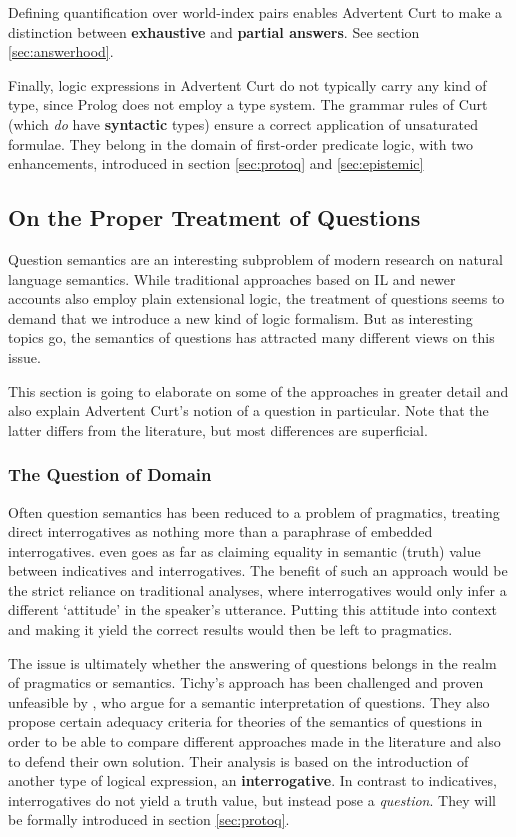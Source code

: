 \documentclass[11pt,a4paper]{article}
\newcommand{\abbr}{\textsf} %
\newcommand{\stress}{\textbf} %
\newcommand{\term}[1]{\textsf{\textbf{#1}}} %
\newcommand{\pn}{\textsf} %
\newcommand{\curt}{\pn{Curt}}
\newcommand{\acurt}{\pn{Advertent Curt}}
\newcommand{\prol}{\pn{Prolog}}
\theoremstyle{remark}
\theoremstyle{remark}
\theoremstyle{definition}
\begin{document}
Defining quantification over world-index pairs enables \acurt{} to make a
distinction between \term{exhaustive} and \term{partial answers}. See section
\ref{sec:answerhood}.

Finally, logic expressions in \acurt{} do not typically carry any kind of type,
since \prol{} does not employ a type system. The grammar rules of \curt{} (which
\emph{do} have \stress{syntactic} types) ensure a correct application of
unsaturated formulae. They belong in the domain of first-order predicate logic,
with two enhancements, introduced in section \ref{sec:protoq} and \ref{sec:epistemic}

\subsection{On the Proper Treatment of Questions}

Question semantics are an interesting subproblem of modern research on natural
language semantics. While traditional approaches based on \abbr{IL} and newer
accounts also employ plain extensional logic, %
the treatment
of questions seems to demand that we introduce a new kind of logic formalism.
But as interesting topics go, the semantics of questions has attracted many
different views on this issue.

This section is going to elaborate on some of the approaches in greater detail
and also explain \acurt's notion of a question in particular. Note that the
latter differs from the literature, but most differences are superficial.

\subsubsection{The Question of Domain}

Often question semantics has been reduced to a problem of
pragmatics, treating direct interrogatives as nothing more than a
paraphrase of embedded interrogatives.\cite{tichy}
even goes as far as claiming equality in semantic (truth) value between
indicatives and interrogatives. The benefit of such an approach would be the
strict reliance on traditional analyses, where interrogatives would only infer a
different `attitude' in the speaker's utterance. Putting this attitude into
context and making it yield the correct results would then be left to
pragmatics.

The issue is ultimately whether the answering of questions belongs in the realm
of pragmatics or semantics. Tichy's approach has been challenged and proven
unfeasible by \cite{gs:q}, who argue for a semantic interpretation of questions.
They also propose certain adequacy criteria for theories of the semantics of
questions in order to be able to compare different approaches made in the
literature and also to defend their own solution. Their analysis is based on the
introduction of another type of logical expression, an \term{interrogative}.
In contrast to indicatives, interrogatives do not yield a truth value, but
instead pose a \emph{question}. They will be formally introduced in section
\ref{sec:protoq}.
\end{document}
